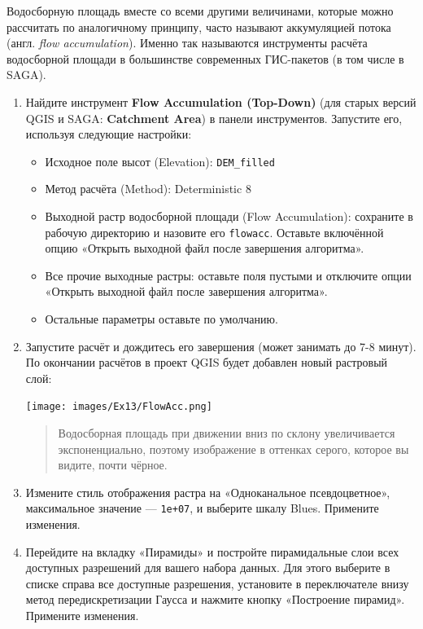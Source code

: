 \documentclass[
  12pt,
]{book}
\providecommand{\tightlist}{%
  \setlength{\itemsep}{0pt}\setlength{\parskip}{0pt}}
\begin{document}
Водосборную площадь вместе со всеми другими величинами, которые можно рассчитать по аналогичному принципу, часто называют аккумуляцией потока (англ. \emph{flow accumulation}). Именно так называются инструменты расчёта водосборной площади в большинстве современных ГИС-пакетов (в том числе в SAGA).

\begin{enumerate}
\def\labelenumi{\arabic{enumi}.}
\item
  Найдите инструмент \textbf{Flow Accumulation (Top-Down)} (для старых версий QGIS и SAGA: \textbf{Catchment Area}) в панели инструментов. Запустите его, используя следующие настройки:

  \begin{itemize}
  \tightlist
  \item
    Исходное поле высот (Elevation): \texttt{DEM\_filled}
  \item
    Метод расчёта (Method): Deterministic 8
  \item
    Выходной растр водосборной площади (Flow Accumulation): сохраните в рабочую директорию и назовите его \texttt{flowacc}. Оставьте включённой опцию «Открыть выходной файл после завершения алгоритма».
  \item
    Все прочие выходные растры: оставьте поля пустыми и отключите опции «Открыть выходной файл после завершения алгоритма».
  \item
    Остальные параметры оставьте по умолчанию.
  \end{itemize}
\item
  Запустите расчёт и дождитесь его завершения (может занимать до 7-8 минут). По окончании расчётов в проект QGIS будет добавлен новый растровый слой:

  \texttt{[image: images/Ex13/FlowAcc.png]}

  \begin{quote}
  Водосборная площадь при движении вниз по склону увеличивается экспоненциально, поэтому изображение в оттенках серого, которое вы видите, почти чёрное.
  \end{quote}
\item
  Измените стиль отображения растра на «Одноканальное псевдоцветное», максимальное значение --- \texttt{1e+07}, и выберите шкалу Blues. Примените изменения.
\item
  Перейдите на вкладку «Пирамиды» и постройте пирамидальные слои всех доступных разрешений для вашего набора данных. Для этого выберите в списке справа все доступные разрешения, установите в переключателе внизу метод передискретизации Гаусса и нажмите кнопку «Построение пирамид». Примените изменения.


\end{enumerate}
\end{document}
